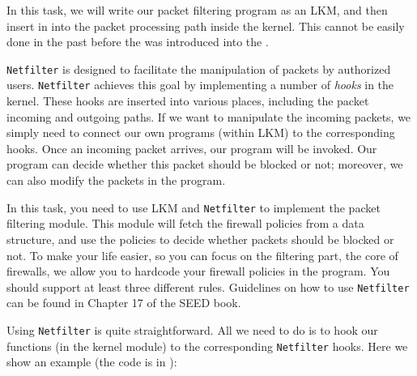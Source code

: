 In this task, we will write our packet filtering program
as an LKM, and then insert in into the packet processing path
inside the kernel. This cannot be easily done in the past before 
the \Netfilter was introduced into the \linux.

{\tt Netfilter} is designed to facilitate the manipulation of 
packets by authorized users. {\tt Netfilter} achieves this 
goal by implementing a number of {\em hooks} in the 
\linux kernel. These hooks are inserted into various places, 
including the packet incoming and outgoing paths. 
If we want to manipulate the incoming packets, we simply
need to connect our own programs (within LKM) to the 
corresponding hooks. Once an incoming packet arrives, 
our program will be invoked. Our program can decide 
whether this packet should be blocked or not; moreover,
we can also modify the packets in the program.


In this task, you need to use LKM and {\tt Netfilter} to implement
the packet filtering module.  This module will fetch 
the firewall policies from a data structure, and use the 
policies to decide whether packets should be blocked or not.
To make your life easier, so you can focus on the filtering part, 
the core of firewalls, we allow you to hardcode your firewall policies 
in the program. You should support at least three different 
rules. Guidelines on how to use \texttt{Netfilter} can be 
found in Chapter 17 of the SEED book.


Using {\tt Netfilter} is quite straightforward. All we need to do
is to hook our functions (in the kernel module) to the corresponding
{\tt Netfilter} hooks. Here we show an example (the code is in
):


